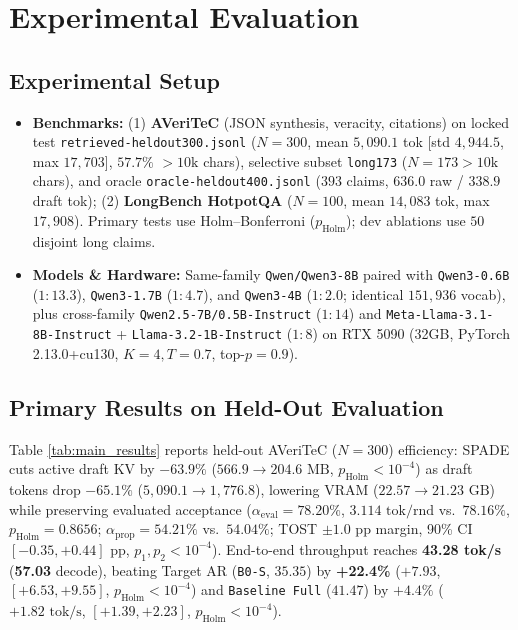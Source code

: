\documentclass[11pt]{article}
\begin{document}
\section{Experimental Evaluation}
\label{sec:experiments}

\subsection{Experimental Setup}
\begin{itemize}
    \item \textbf{Benchmarks:} (1) \textbf{AVeriTeC} \citep{schlichtkrull2023averitec} (JSON synthesis, veracity, citations) on locked test \texttt{retrieved-heldout300.jsonl} ($N=300$, mean $5,090.1$ tok [std $4,944.5$, max $17,703$], $57.7\%$ $>10\text{k}$ chars), selective subset \texttt{long173} ($N=173 >10\text{k}$ chars), and oracle \texttt{oracle-heldout400.jsonl} ($393$ claims, $636.0$ raw / $338.9$ draft tok); (2) \textbf{LongBench HotpotQA} \citep{bai2024longbench,yang2018hotpotqa} ($N=100$, mean $14,083$ tok, max $17,908$). Primary tests use Holm--Bonferroni ($p_{\text{Holm}}$); dev ablations use $50$ disjoint long claims.
    \item \textbf{Models \& Hardware:} Same-family \texttt{Qwen/Qwen3-8B} paired with \texttt{Qwen3-0.6B} ($1:13.3$), \texttt{Qwen3-1.7B} ($1:4.7$), and \texttt{Qwen3-4B} ($1:2.0$; identical $151,936$ vocab), plus cross-family \texttt{Qwen2.5-7B/0.5B-Instruct} ($1:14$) and \texttt{Meta-Llama-3.1-8B-Instruct} + \texttt{Llama-3.2-1B-Instruct} ($1:8$) on RTX 5090 (32GB, PyTorch 2.13.0+cu130, $K=4, T=0.7$, top-$p=0.9$).
\end{itemize}

\subsection{Primary Results on Held-Out Evaluation}
\label{sec:main_results}
Table \ref{tab:main_results} reports held-out AVeriTeC ($N=300$) efficiency: SPADE cuts active draft KV by \textbf{$-63.9\%$} ($566.9 \to 204.6\text{ MB}$, $p_{\text{Holm}} < 10^{-4}$) as draft tokens drop $-65.1\%$ ($5,090.1 \to 1,776.8$), lowering VRAM ($22.57 \to 21.23\text{ GB}$) while preserving evaluated acceptance ($\alpha_{\text{eval}} = \mathbf{78.20\%}$, $3.114\text{ tok/rnd}$ vs.\ $78.16\%$, $p_{\text{Holm}} = 0.8656$; $\alpha_{\text{prop}} = 54.21\%$ vs.\ $54.04\%$; TOST $\pm 1.0\text{ pp}$ margin, 90\% CI $[-0.35, +0.44]\text{ pp}$, $p_1, p_2 < 10^{-4}$). End-to-end throughput reaches \textbf{43.28 tok/s} (\textbf{57.03} decode), beating Target AR (\texttt{B0-S}, $35.35$) by \textbf{+22.4\%} ($+7.93$, $[+6.53, +9.55]$, $p_{\text{Holm}} < 10^{-4}$) and \texttt{Baseline Full} ($41.47$) by $+4.4\%$ ($+1.82\text{ tok/s}$, $[+1.39, +2.23]$, $p_{\text{Holm}} < 10^{-4}$).
\end{document}
